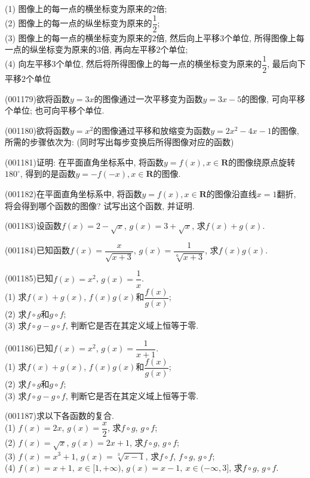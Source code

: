 (1) 图像上的每一点的横坐标变为原来的$2$倍;\\ 
(2) 图像上的每一点的纵坐标变为原来的$\dfrac{1}{2}$;\\ 
(3) 图像上的每一点的横坐标变为原来的$2$倍, 然后向上平移$3$个单位, 所得图像上每一点的纵坐标变为原来的$3$倍, 再向左平移$2$个单位;\\ 
(4) 向左平移$3$个单位, 然后将所得图像上的每一点的横坐标变为原来的$\dfrac{1}{2}$, 最后向下平移$2$个单位
\item (001179)欲将函数$y=3x$的图像通过一次平移变为函数$y=3x-5$的图像, 可向平移个单位; 也可向平移个单位.
\item (001180)欲将函数$y=x^2$的图像通过平移和放缩变为函数$y=2x^2-4x-1$的图像, 所需的步骤依次为: (同时写出每步变换后所得图像对应的函数)
\item (001181)证明: 在平面直角坐标系中, 将函数$y=f(x),x\in \mathbf{R}$的图像绕原点旋转$180^\circ$, 得到的是函数$y=-f(-x),x\in \mathbf{R}$的图像.
\item (001182)在平面直角坐标系中, 将函数$y=f(x),x\in \mathbf{R}$的图像沿直线$x=1$翻折, 将会得到哪个函数的图像? 试写出这个函数, 并证明.
\item (001183)设函数$f(x)=2-\sqrt{x}$, $g(x)=3+\sqrt{x}$, 求$f(x)+g(x)$.
\item (001184)已知函数$f(x)=\dfrac{x}{\sqrt{x+3}}$, $g(x)=\dfrac{1}{\sqrt[6]{x+3}}$, 求$f(x)g(x)$.
\item (001185)已知$f(x)=x^2$, $g(x)=\dfrac{1}{x}$.\\ 
(1) 求$f(x)+g(x)$, $f(x)g(x)$和$\dfrac{f(x)}{g(x)}$;\\ 
(2) 求$f\circ g$和$g\circ f$;\\ 
(3) 求$f\circ g-g\circ f$, 判断它是否在其定义域上恒等于零.
\item (001186)已知$f(x)=x^2$, $g(x)=\dfrac{1}{x+1}$.\\ 
(1) 求$f(x)+g(x)$, $f(x)g(x)$和$\dfrac{f(x)}{g(x)}$;\\ 
(2) 求$f\circ g$和$g\circ f$;\\ 
(3) 求$f\circ g-g\circ f$, 判断它是否在其定义域上恒等于零.
\item (001187)求以下各函数的复合.\\ 
(1) $f(x)=2x$, $g(x)=\dfrac{x}{2}$, 求$f\circ g$, $g\circ f$;\\ 
(2) $f(x)=\sqrt{x}$, $g(x)=2x+1$, 求$f\circ g$, $g\circ f$;\\ 
(3) $f(x)=x^3+1$, $g(x)=\sqrt[3]{x-1}$, 求$f\circ f$, $f\circ g$, $g\circ f$;\\ 
(4) $f(x)=x+1,\ x \in [1,+\infty)$, $g(x)=x-1, \  x \in (-\infty,3]$, 求$f\circ g$, $g\circ f$.
